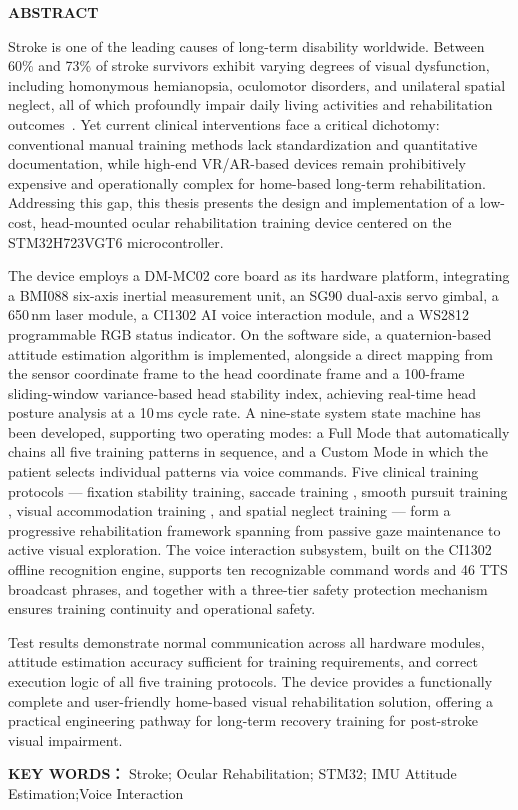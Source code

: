 \vskip 14pt

\begin{center}
{\textbf{ABSTRACT}}
\end{center}

\vskip 14pt

{
Stroke is one of the leading causes of long-term disability worldwide. Between 60\% and 73\% of stroke survivors exhibit varying degrees of visual dysfunction, including homonymous hemianopsia, oculomotor disorders, and unilateral spatial neglect, all of which profoundly impair daily living activities and rehabilitation outcomes~\cite{rowe2021ivis,liu2023vision,zheng2025stroke,sun2024pursuit}. Yet current clinical interventions face a critical dichotomy: conventional manual training methods lack standardization and quantitative documentation, while high-end VR/AR-based devices remain prohibitively expensive and operationally complex for home-based long-term rehabilitation. Addressing this gap, this thesis presents the design and implementation of a low-cost, head-mounted ocular rehabilitation training device centered on the STM32H723VGT6 microcontroller.

The device employs a DM-MC02 core board as its hardware platform, integrating a BMI088 six-axis inertial measurement unit, an SG90 dual-axis servo gimbal, a 650\,nm laser module, a CI1302 AI voice interaction module, and a WS2812 programmable RGB status indicator. On the software side, a quaternion-based attitude estimation algorithm is implemented, alongside a direct mapping from the sensor coordinate frame to the head coordinate frame and a 100-frame sliding-window variance-based head stability index, achieving real-time head posture analysis at a 10\,ms cycle rate. A nine-state system state machine has been developed, supporting two operating modes: a Full Mode that automatically chains all five training patterns in sequence, and a Custom Mode in which the patient selects individual patterns via voice commands. Five clinical training protocols — fixation stability training, saccade training , smooth pursuit training , visual accommodation training , and spatial neglect training  — form a progressive rehabilitation framework spanning from passive gaze maintenance to active visual exploration. The voice interaction subsystem, built on the CI1302 offline recognition engine, supports ten recognizable command words and 46 TTS broadcast phrases, and together with a three-tier safety protection mechanism ensures training continuity and operational safety.

Test results demonstrate normal communication across all hardware modules, attitude estimation accuracy sufficient for training requirements, and correct execution logic of all five training protocols. The device provides a functionally complete and user-friendly home-based visual rehabilitation solution, offering a practical engineering pathway for long-term recovery training for post-stroke visual impairment.

}

\vskip 14pt

\noindent
{\textbf{KEY WORDS：}}{ Stroke; Ocular Rehabilitation; STM32; IMU Attitude Estimation;Voice Interaction}
\clearpage

